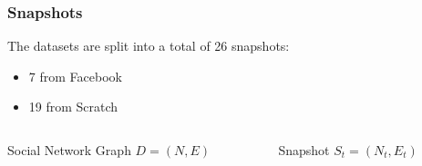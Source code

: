 \begin{frame}
\frametitle{Snapshots}
The datasets are split into a total of 26 snapshots:
\begin{itemize}
\item 7 from Facebook
\item 19 from Scratch
\end{itemize}
\begin{columns}
	\begin{column}{0.5\textwidth}\centering
			\begin{block} {\small Social Network Graph}
				$D = (N,E)$
			\end{block}
		\end{column}
		\begin{column}{0.5\textwidth}\centering
			\begin{block} {\small Snapshot}
				$S_t = (N_t,E_t)$
			\end{block}
		\end{column}
	\end{columns}
\end{frame}


